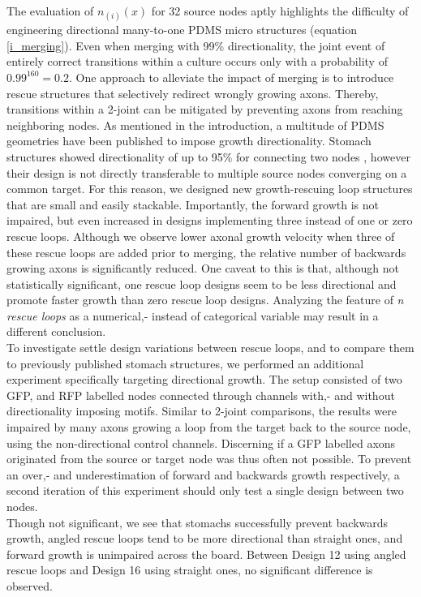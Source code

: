 The evaluation of $n_{(i)}(x)$ for 32 source nodes aptly highlights the
difficulty of engineering directional many-to-one PDMS micro structures
(equation \ref{i_merging}). Even when merging with 99\% directionality, the
joint event of entirely correct transitions within a culture occurs only with a
probability of $0.99^{160}=0.2$. One approach to alleviate the impact of merging
is to introduce rescue structures that selectively redirect wrongly growing
axons. Thereby, transitions within a 2-joint can be mitigated by preventing
axons from reaching neighboring nodes. As mentioned in the introduction, a
multitude of PDMS geometries have been published to impose growth
directionality. Stomach structures showed directionality of up to 95\% for
connecting two nodes \parencite{forro}, however their design is not directly
transferable to multiple source nodes converging on a common target. For this
reason, we designed new growth-rescuing loop structures that are small and
easily stackable. Importantly, the forward growth is not impaired, but even
increased in designs implementing three instead of one or zero rescue loops.
Although we observe lower axonal growth velocity when three of these rescue
loops are added prior to merging, the relative number of backwards growing axons
is significantly reduced. One caveat to this is that, although not statistically
significant, one rescue loop designs seem to be less directional and promote
faster growth than zero rescue loop designs. Analyzing the feature of \textit{n
rescue loops} as a numerical,- instead of categorical variable may result in a
different conclusion. \\

To investigate settle design variations between rescue loops, and to compare
them to previously published stomach structures, we performed an additional
experiment specifically targeting directional growth. The setup consisted of two
GFP, and RFP labelled nodes connected through channels with,- and without
directionality imposing motifs. Similar to 2-joint comparisons, the results were
impaired by many axons growing a loop from the target back to the source node,
using the non-directional control channels. Discerning if a GFP labelled axons
originated from the source or target node was thus often not possible. To
prevent an over,- and underestimation of forward and backwards growth
respectively, a second iteration of this experiment should only test a single
design between two nodes. \\
Though not significant, we see that stomachs successfully prevent backwards
growth, angled rescue loops tend to be more directional than straight ones, and
forward growth is unimpaired across the board. Between Design 12 using angled
rescue loops and Design 16 using straight ones, no significant difference is
observed.


